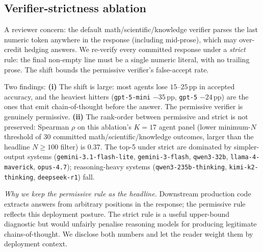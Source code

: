 \subsection{Verifier-strictness ablation}\label{app:strictness}
A reviewer concern: the default math/scientific/knowledge verifier parses
the last numeric token anywhere in the response (including mid-prose),
which may over-credit hedging answers. We re-verify every committed
response under a \emph{strict} rule: the final non-empty line must be a
single numeric literal, with no trailing prose. The shift bounds the
permissive verifier's false-accept rate.



Two findings:
\textbf{(i)} The shift is large: most agents lose $15$--$25$\,pp in
accepted accuracy, and the heaviest hitters
(\texttt{gpt-5-mini} $-35$\,pp, \texttt{gpt-5} $-24$\,pp) are the ones
that emit chain-of-thought before the answer. The permissive verifier
is genuinely permissive.
\textbf{(ii)} The rank-order between permissive and strict is not
preserved: Spearman $\rho$ on this ablation's $K = 17$ agent panel
(lower minimum-$N$ threshold of $30$ committed math/scientific/knowledge
outcomes, larger than the headline $N \ge 100$ filter) is $0.37$. The top-5
under strict are dominated by simpler-output systems
(\texttt{gemini-3.1-flash-lite}, \texttt{gemini-3-flash},
\texttt{qwen3-32b}, \texttt{llama-4-maverick}, \texttt{opus-4.7});
reasoning-heavy systems (\texttt{qwen3-235b-thinking},
\texttt{kimi-k2-thinking}, \texttt{deepseek-r1}) fall.

\emph{Why we keep the permissive rule as the headline.} Downstream
production code extracts answers from arbitrary positions in the
response; the permissive rule reflects this deployment posture. The
strict rule is a useful upper-bound diagnostic but would unfairly
penalise reasoning models for producing legitimate chains-of-thought.
We disclose both numbers and let the reader weight them by deployment
context.

